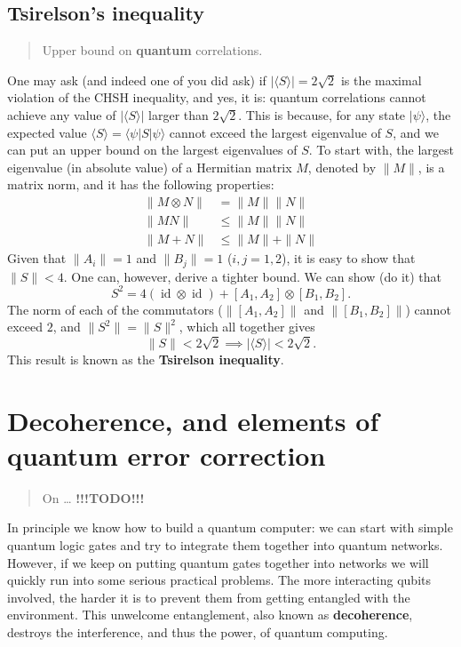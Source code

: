 \documentclass{article}
\begin{document}
\hypertarget{tsirelsons-inequality}{%
\subsection{Tsirelson's inequality}\label{tsirelsons-inequality}}

\begin{quote}
Upper bound on \textbf{quantum} correlations.
\end{quote}

One may ask (and indeed one of you did ask) if \(|\langle S\rangle|= 2\sqrt{2}\) is the maximal violation of the CHSH inequality, and yes, it is: quantum correlations cannot achieve any value of \(|\langle S\rangle|\) larger than \(2\sqrt{2}\).
This is because, for any state \(|\psi\rangle\), the expected value \(\langle S\rangle = \langle\psi|S|\psi\rangle\) cannot exceed the largest eigenvalue of \(S\), and we can put an upper bound on the largest eigenvalues of \(S\).
To start with, the largest eigenvalue (in absolute value) of a Hermitian matrix \(M\), denoted by \(\|M\|\), is a matrix norm, and it has the following properties:
\[
\begin{aligned}
  \|M\otimes N\|
  & = \|M\| \|N\|
\\\|MN\|
  & \leq \|M\| \|N\|
\\\|M+N\|
  & \leq \|M\| + \|N\|
\end{aligned}
\]
Given that \(\|A_i\|=1\) and \(\|B_j\|=1\) (\(i,j=1,2\)), it is easy to show that \(\|S\| < 4\).
One can, however, derive a tighter bound.
We can show (do it) that
\[
  S^2
  = 4(\operatorname{id}\otimes\operatorname{id}) + [A_1,A_2]\otimes[B_1,B_2].
\]
The norm of each of the commutators (\(\|[A_1, A_2]\|\) and \(\|[B_1, B_2]\|\)) cannot exceed \(2\), and \(\|S^2\|=\|S\|^2\), which all together gives
\[
  \|S\|
  < 2\sqrt{2}
  \implies
  |\langle S\rangle| < 2\sqrt{2}.
\]
This result is known as the \textbf{Tsirelson inequality}.

\hypertarget{chapter8}{%
\section{Decoherence, and elements of quantum error correction}\label{chapter8}}

\begin{quote}
On \ldots{} \textbf{!!!TODO!!!}
\end{quote}

In principle we know how to build a quantum computer: we can start with simple quantum logic gates and try to integrate them together into quantum networks.
However, if we keep on putting quantum gates together into networks we will quickly run into some serious practical problems.
The more interacting qubits involved, the harder it is to prevent them from getting entangled with the environment.
This unwelcome entanglement, also known as \textbf{decoherence}, destroys the interference, and thus the power, of quantum computing.
\end{document}
